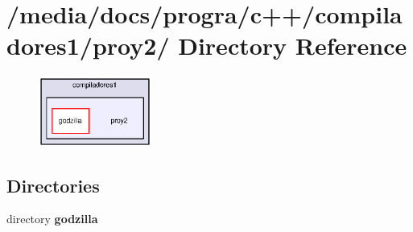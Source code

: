\section{/media/docs/progra/c++/compiladores1/proy2/ Directory Reference}
\label{dir_000005}


\begin{figure}[H]
\begin{center}
\leavevmode
\includegraphics[width=105pt]{dir_000005_dep}
\end{center}
\end{figure}
\subsection*{Directories}
\begin{CompactItemize}
\item 
directory {\bf godzilla}
\end{CompactItemize}
